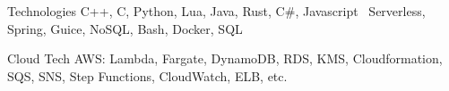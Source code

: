 


\begin{cvskills}


\cvskill
{Technologies}
    {C++, C, Python, Lua, Java, Rust, C\#, Javascript \
    Serverless, Spring, Guice, NoSQL, Bash, Docker, SQL}

\cvskill
{Cloud Tech}
    {AWS: Lambda, Fargate, DynamoDB, RDS, KMS, Cloudformation, SQS, SNS, Step Functions, CloudWatch, ELB, etc.}



\end{cvskills}
